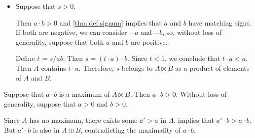\begin{defproof}
\begin{itemize}
    \item Suppose that \( s > 0 \).

    Then \( a \cdot b > 0 \) and \cref{thm:def:signum} implies that \( a \) and \( b \) have matching signs. If both are negative, we can consider \( -a \) and \( -b \), so, without loss of generality, suppose that both \( a \) and \( b \) are positive.

    Define \( t \coloneqq s / ab \). Then \( s = (t \cdot a) \cdot b \). Since \( t < 1 \), we conclude that \( t \cdot a < a \). Then \( A \) contains \( t \cdot a \). Therefore, \( s \) belongs to \( A \boxtimes B \) as a product of elements of \( A \) and \( B \).
  \end{itemize}

   Suppose that \( a \cdot b \) is a maximum of \( A \boxtimes B \). Then \( a \cdot b > 0 \). Without loss of generality, suppose that \( a > 0 \) and \( b > 0 \).

  Since \( A \) has no maximum, there exists some \( a' > a \) in \( A \).  implies that \( a' \cdot b > a \cdot b \). But \( a' \cdot b \) is also in \( A \boxplus B \), contradicting the maximality of \( a \cdot b \).
\end{defproof}

